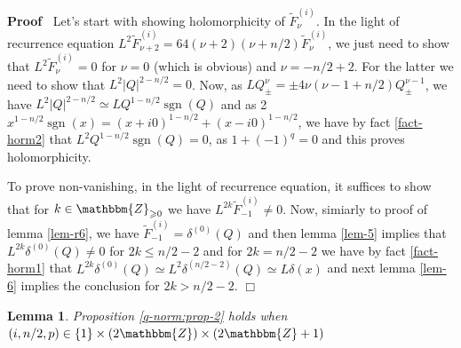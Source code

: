 \documentclass{article}
\newcommand{\tmop}[1]{\ensuremath{\operatorname{#1}}}
\newenvironment{proof}{\noindent\textbf{Proof\ }}{\hspace*{\fill}$\Box$\medskip}
\numberwithin{definition}{section}
\newtheorem{lemma}{Lemma}
\numberwithin{lemma}{section}
\numberwithin{proposition}{section}
{\theorembodyfont{\rmfamily}\newtheorem{remark}{Remark}
\numberwithin{remark}{section}
}
\begin{document}
\begin{proof}
  Let's start with showing holomorphicity of $\tilde{F}^{( i)}_{\nu}$. In the
  light of recurrence equation $L^2 \tilde{F}_{\nu + 2}^{( i)} = 64 ( \nu + 2)
  ( \nu + n / 2) \tilde{F}_{\nu}^{( i)}$, we just need to show that $L^2
  \tilde{F}_{\nu}^{( i)} = 0$ for $\nu = 0$ (which is obvious) and $\nu = - n
  / 2 + 2$. For the latter we need to show that $L^2 | Q |^{2 - n / 2} = 0$.
  Now, as $L Q_{\pm}^{\nu} = \pm 4 \nu ( \nu - 1 + n / 2) Q_{\pm}^{\nu - 1}$,
  we have $L^2 | Q |^{2 - n / 2} \simeq L Q^{1 - n / 2} \tmop{sgn} ( Q)$ and
  as 2$x^{1 - n / 2} \tmop{sgn} ( x) = ( x + i 0)^{1 - n / 2} + ( x - i 0)^{1
  - n / 2}$, we have by fact \ref{fact-horm2} that $L^2 Q^{1 - n / 2}
  \tmop{sgn} ( Q) = 0$, as $1 + ( - 1)^q = 0$ and this proves holomorphicity.
  
  To prove non-vanishing, in the light of recurrence equation, it suffices to
  show that for $k \in \mathbbm{Z}_{\geqslant 0}$ we have $L^{2 k}
  \tilde{F}_{- 1}^{( i)} \neq 0$. Now, simiarly to proof of lemma
  \ref{lem-r6}, we have $\tilde{F}_{- 1}^{( i)} = \delta^{( 0)} ( Q)$ and then
  lemma \ref{lem-5} implies that $L^{2 k} \delta^{( 0)} ( Q) \neq 0$ for $2 k
  \leqslant n / 2 - 2$ and for $2 k = n / 2 - 2$ we have by fact
  \ref{fact-horm1} that $L^{2 k} \delta^{( 0)} ( Q) \simeq L^2 \delta^{( n / 2
  - 2)} ( Q) \simeq L \delta ( x)$ and next lemma \ref{lem-6} implies the
  conclusion for $2 k > n / 2 - 2$.
\end{proof}

\begin{lemma}
  \label{lem-r7}Proposition \ref{q-norm:prop-2} holds when $( i, n / 2, p) \in
  \{ 1 \} \times ( 2\mathbbm{Z}) \times ( 2\mathbbm{Z}+ 1)$
\end{lemma}
\end{document}

